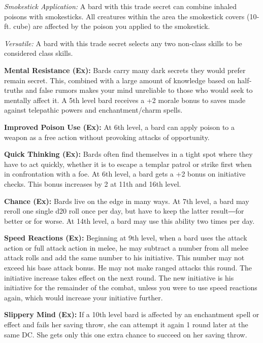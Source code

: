 \documentclass[10pt,a4paper,twocolumn]{d20}
\begin{document}
{\textit{Smokestick Application:} A bard with this trade secret can combine inhaled poisons with smokesticks. All creatures within the area the smokestick covers (10‐ft. cube) are affected by the poison you applied to the smokestick.

\textit{Versatile:} A bard with this trade secret selects any two non‐class skills to be considered class skills.

\textbf{Mental Resistance (Ex):} Bards carry many dark secrets they would prefer remain secret. This, combined with a large amount of knowledge based on half‐truths and false rumors makes your mind unreliable to those who would seek to mentally affect it. A 5th level bard receives a +2 morale bonus to saves made against telepathic powers and enchantment/charm spells.

\textbf{Improved Poison Use (Ex):} At 6th level, a bard can apply poison to a weapon as a free action without provoking attacks of opportunity.

\textbf{Quick Thinking (Ex):} Bards often find themselves in a tight spot where they have to act quickly, whether it is to escape a templar patrol or strike first when in confrontation with a foe. At 6th level, a bard gets a +2 bonus on initiative checks. This bonus increases by 2 at 11th and 16th level.

\textbf{Chance (Ex):} Bards live on the edge in many ways. At 7th level, a bard may reroll one single d20 roll once per day, but have to keep the latter result―for better or for worse. At 14th level, a bard may use this ability two times per day.

\textbf{Speed Reactions (Ex):} Beginning at 9th level, when a bard uses the attack action or full attack action in melee, he may subtract a number from all melee attack rolls and add the same number to his initiative. This number may not exceed his base attack bonus. He may not make ranged attacks this round. The initiative increase takes effect on the next round. The new initiative is his initiative for the remainder of the combat, unless you were to use speed reactions again, which would increase your initiative further.

\textbf{Slippery Mind (Ex):} If a 10th level bard is affected by an enchantment spell or effect and fails her saving throw, she can attempt it again 1 round later at the same DC. She gets only this one extra chance to succeed on her saving throw.

}
\end{document}
